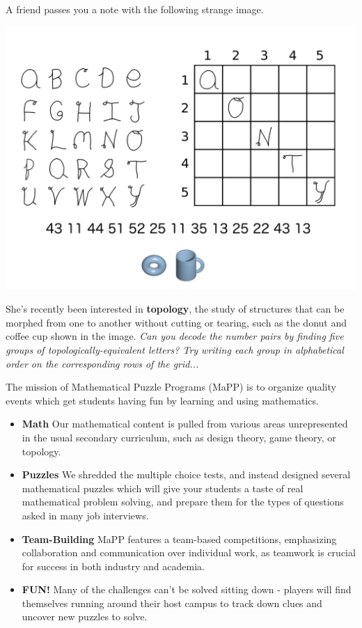 \documentclass{puzzlehunt}
\title{\phEventName}
\author{Mathematical Puzzle Programs}
\date{\today}
\begin{document}

A friend passes you a note with the following strange image.

\includegraphics[width=0.9\linewidth]{assets/topology-puzzle.png}

She's recently been interested in \textbf{topology}, the study of structures
that can be morphed from one to another without cutting or tearing, such as
the donut and coffee cup shown in the image.
\textit{Can you decode the number pairs by finding five groups of
topologically-equivalent letters? Try writing each group in alphabetical
order on the corresponding rows of the grid...}


The mission of Mathematical Puzzle Programs (MaPP) is to organize quality events
which get students having fun by learning and using mathematics.

\begin{itemize}
\item \textbf{Math}\newline
Our mathematical content is pulled from various areas unrepresented in the
usual secondary curriculum,
such as design theory, game theory, or topology.

\item \textbf{Puzzles}\newline
We shredded the multiple choice tests, and instead designed several
mathematical puzzles which will
give your students a taste of real mathematical problem solving, and prepare
them for the types of questions asked in many job interviews.

\item \textbf{Team-Building}\newline
MaPP features a team-based competitions, emphasizing collaboration and
communication over individual work, as teamwork is crucial for success in both
industry and academia.

\item \textbf{FUN!}\newline
Many of the challenges can't be solved sitting down - players will find
themselves running around their
host campus to track down clues and uncover new puzzles to solve.
\end{itemize}
\end{document}
